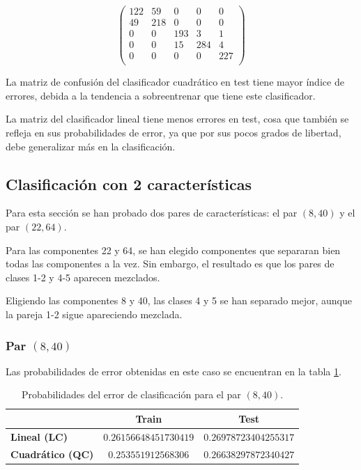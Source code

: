 \documentclass[11pt]{article} %
\begin{document}
\begin{equation} \label{eq:db:cm:quad}
\left( \begin{array}{ccccc}
122 & 59 & 0 & 0 & 0 \\
49 & 218 & 0 & 0 & 0 \\
0 & 0 & 193 & 3 & 1 \\
0 & 0 & 15 & 284 & 4 \\
0 & 0 & 0 & 0 & 227 \\ 
\end{array} \right)
\end{equation}

La matriz de confusión del clasificador cuadrático en test tiene mayor índice de errores, debida a la tendencia a sobreentrenar que tiene este clasificador.

La matriz del clasificador lineal tiene menos errores en test, cosa que también se refleja en sus probabilidades de error, ya que por sus pocos grados de libertad, debe generalizar más en la clasificación.

\subsection{Clasificación con 2 características}

Para esta sección se han probado dos pares de características: el par $\left(8, 40\right)$ y el par $\left(22, 64\right)$.

Para las componentes 22 y 64, se han elegido componentes que separaran bien todas las componentes a la vez. Sin embargo, el resultado es que los pares de clases 1-2 y 4-5 aparecen mezclados.

Eligiendo las componentes 8 y 40, las clases 4 y 5 se han separado mejor, aunque la pareja 1-2 sigue apareciendo mezclada.

\clearpage

\subsubsection{Par $\left(8, 40\right)$}

Las probabilidades de error obtenidas en este caso se encuentran en la tabla \ref{tab:2c:8_40:prob}.

\begin{table}%
	\begin{center}
		\begin{tabular}{| l | c | c |}
			\hline
			\diagbox[width=10em]{\textbf{Clasificador}}{\textbf{Fase}} & \textbf{Train} & \textbf{Test} \\
			\hline
			\textbf{Lineal (LC)} & $ 0.26156648451730419 $ & $ 0.26978723404255317 $ \\
			\hline
			\textbf{Cuadrático (QC)} & $ 0.253551912568306 $ & $ 0.26638297872340427 $ \\
			\hline
		\end{tabular}
		\caption{Probabilidades del error de clasificación para el par $\left(8, 40\right)$.}
		\label{tab:2c:8_40:prob}
	\end{center}
\end{table}
\end{document}
